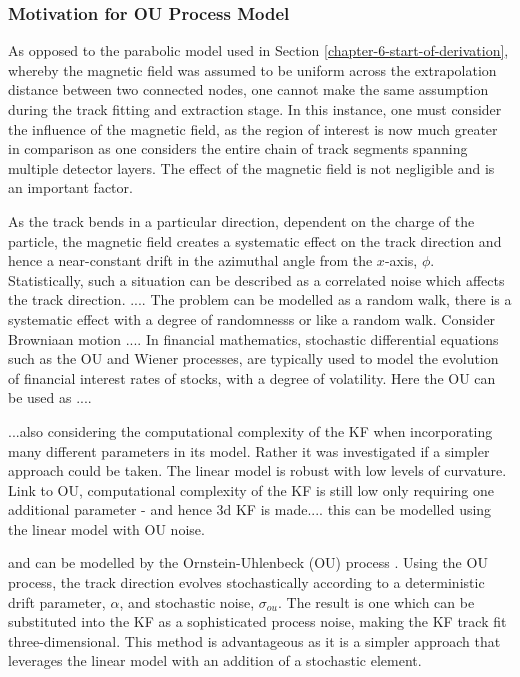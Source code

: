 \subsubsection{Motivation for OU Process Model}

As opposed to the parabolic model used in Section \ref{chapter-6-start-of-derivation}, whereby the magnetic field was assumed to be uniform across the extrapolation distance between two connected nodes, one cannot make the same assumption during the track fitting and extraction stage. In this instance, one must consider the influence of the magnetic field, as the region of interest is now much greater in comparison as one considers the entire chain of track segments spanning multiple detector layers. The effect of the magnetic field is not negligible and is an important factor.

As the track bends in a particular direction, dependent on the charge of the particle, the magnetic field creates a systematic effect on the track direction and hence a near-constant drift in the azimuthal angle from the $x$-axis, $\phi$. Statistically, such a situation can be described as a correlated noise which affects the track direction. .... The problem can be modelled as a random walk, there is a systematic effect with a degree of randomnesss or like a random walk. Consider Browniaan motion .... In financial mathematics, stochastic differential equations such as the OU and Wiener processes, are typically used to model the evolution of financial interest rates of stocks, with a degree of volatility. Here the OU can be used as ....


...also considering the computational complexity of the KF when incorporating many different parameters in its model. Rather it was investigated if a simpler approach could be taken. The linear model is robust with low levels of curvature. Link to OU, computational complexity of the KF is still low only requiring one additional parameter - and hence 3d KF is made.... this can be modelled using the linear model with OU noise.

and can be modelled by the Ornstein-Uhlenbeck (OU) process \cite{OU}. Using the OU process, the track direction evolves stochastically according to a deterministic drift parameter, $\alpha$, and stochastic noise, $\sigma_{ou}$. The result is one which can be substituted into the KF as a sophisticated process noise, making the KF track fit three-dimensional. This method is advantageous as it is a simpler approach that leverages the linear model with an addition of a stochastic element.


